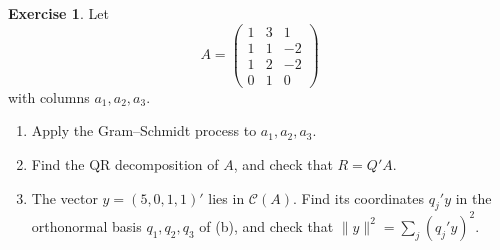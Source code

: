 \documentclass[12pt]{article}
\theoremstyle{definition}
\newtheorem{exercise}{Exercise}
\begin{document}
\begin{exercise}\label{r6-dr-qr}
Let
\[
A=\begin{pmatrix}1&3&1\\1&1&-2\\1&2&-2\\0&1&0\end{pmatrix}
\]
with columns \(a_1,a_2,a_3\).
\begin{enumerate}
\item Apply the Gram--Schmidt process to \(a_1,a_2,a_3\).
\item Find the QR decomposition of \(A\), and check that \(R=Q'A\).
\item The vector \(y=(5,0,1,1)'\) lies in \(\mathcal C(A)\). Find its coordinates \(q_j'y\) in the orthonormal basis
\(q_1,q_2,q_3\) of (b), and check that \(\lVert y\rVert^2=\sum_j(q_j'y)^2\).
\end{enumerate}
\end{exercise}
\end{document}
